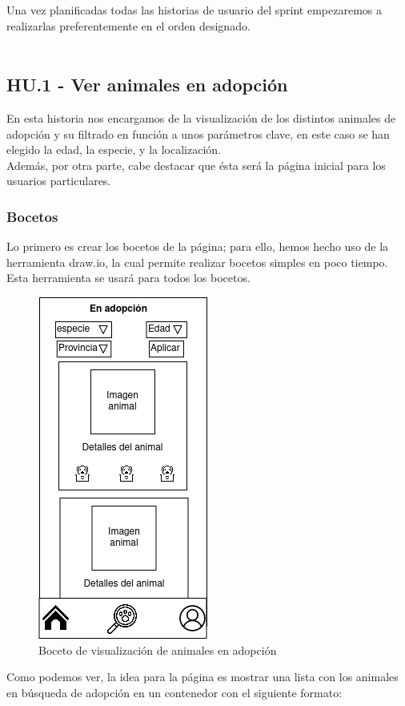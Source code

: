 Una vez planificadas todas las historias de usuario del sprint empezaremos a realizarlas preferentemente en el orden designado. \\ \\

\subsection{HU.1 - Ver animales en adopción}

En esta historia nos encargamos de la visualización de los distintos animales de adopción y su filtrado en función a unos parámetros clave, en este caso se han elegido la edad, la especie, y la localización. \\

Además, por otra parte, cabe destacar que ésta será la página inicial para los usuarios particulares. \\ 

\subsubsection{Bocetos}

Lo primero es crear los bocetos de la página; para ello, hemos hecho uso de la herramienta draw.io, la cual permite realizar bocetos simples en poco tiempo. Esta herramienta se usará para todos los bocetos.

\begin{figure}[H]
	\centering
	\includegraphics[width=0.31\linewidth]{"bocetos/iteracion 1/adopciones"}
	\caption{Boceto de visualización de animales en adopción}
	\label{fig:adopciones}
\end{figure}

Como podemos ver, la idea para la página es mostrar una lista con los animales en búsqueda de adopción en un contenedor con el siguiente formato:

